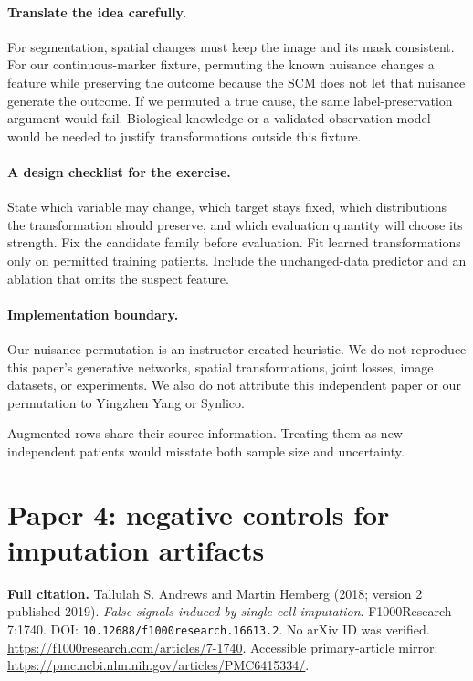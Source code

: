 \documentclass[11pt]{scrartcl}
\begin{document}
\paragraph{Translate the idea carefully.} For segmentation, spatial changes must
keep the image and its mask consistent. For our continuous-marker fixture, permuting
the known nuisance changes a feature while preserving the outcome because the SCM
does not let that nuisance generate the outcome. If we permuted a true cause, the
same label-preservation argument would fail. Biological knowledge or a validated
observation model would be needed to justify transformations outside this fixture.

\paragraph{A design checklist for the exercise.} State which variable may change,
which target stays fixed, which distributions the transformation should preserve,
and which evaluation quantity will choose its strength. Fix the candidate family
before evaluation. Fit learned transformations only on permitted training patients.
Include the unchanged-data predictor and an ablation that omits the suspect feature.

\paragraph{Implementation boundary.} Our nuisance permutation is an instructor-created
heuristic. We do not reproduce this paper's generative networks, spatial transformations,
joint losses, image datasets, or experiments. We also do not attribute this independent
paper or our permutation to Yingzhen Yang or Synlico.

\begin{pitfall}
Augmented rows share their source information. Treating them as new independent
patients would misstate both sample size and uncertainty.
\end{pitfall}

\clearpage
\section*{Paper 4: negative controls for imputation artifacts}
\textbf{Full citation.} Tallulah S. Andrews and Martin Hemberg (2018; version 2
published 2019). \emph{False signals induced by single-cell imputation}.
F1000Research 7:1740. DOI: \texttt{10.12688/f1000research.16613.2}.
No arXiv ID was verified.
\url{https://f1000research.com/articles/7-1740}. Accessible primary-article mirror: \url{https://pmc.ncbi.nlm.nih.gov/articles/PMC6415334/}.
\end{document}
